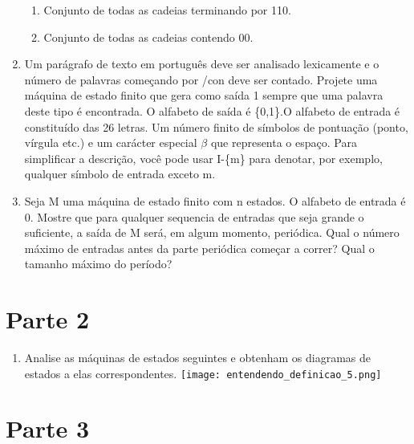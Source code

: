 \documentclass[a4paper,10pt]{article}
\begin{document}
\begin{enumerate}
\begin{enumerate}
	\item Conjunto de todas as cadeias terminando por 110.
	\item Conjunto de todas as cadeias contendo 00.
       \end{enumerate}
  \item Um parágrafo de texto em português deve ser analisado lexicamente e o número de palavras começando por \slash{con} deve ser contado. Projete uma máquina de estado 
	finito que gera como saída 1 sempre que uma palavra deste tipo é encontrada. O alfabeto de saída é \{0,1\}.O alfabeto de entrada é constituído das 26 letras. Um 
	número finito de símbolos de pontuação (ponto, vírgula etc.) e um carácter especial $\beta$ que representa o espaço. Para simplificar a descrição, você pode usar 
	I-\{m\} para denotar, por exemplo, qualquer símbolo de entrada exceto m.
  \item Seja M uma máquina de estado finito com n estados. O alfabeto de entrada é {0}. Mostre que para qualquer sequencia de entradas que seja grande o suficiente, a 
	saída de M será, em algum momento, periódica. Qual o número máximo de entradas antes da parte periódica começar a correr? Qual o tamanho máximo do período?
\end{enumerate}

\section{Parte 2}
\begin{enumerate}
 \item Analise as máquinas de estados seguintes e obtenham os diagramas de estados a elas correspondentes. 
 \texttt{[image: entendendo\_definicao\_5.png]}
\end{enumerate}



\section{Parte 3}
\end{document}
